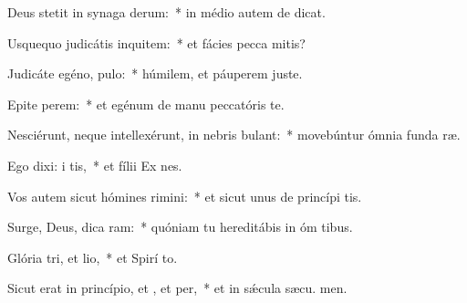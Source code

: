 \item Deus stetit in synaga derum:~* in médio autem de dicat.
\item Usquequo judicátis inquitem:~* et fácies pecca mitis?
\item Judicáte egéno,  pulo:~* húmilem, et páuperem juste.
\item Epite perem:~* et egénum de manu peccatóris te.
\item Nesciérunt, neque intellexérunt, in nebris bulant:~* movebúntur ómnia funda ræ.
\item Ego dixi: i tis,~* et fílii Ex nes.
\item Vos autem sicut hómines rimini:~* et sicut unus de princípi tis.
\item Surge, Deus, dica ram:~* quóniam tu hereditábis in óm tibus.
\item Glória tri, et lio,~* et Spirí to.
\item Sicut erat in princípio, et , et per,~* et in sǽcula sæcu. men.
